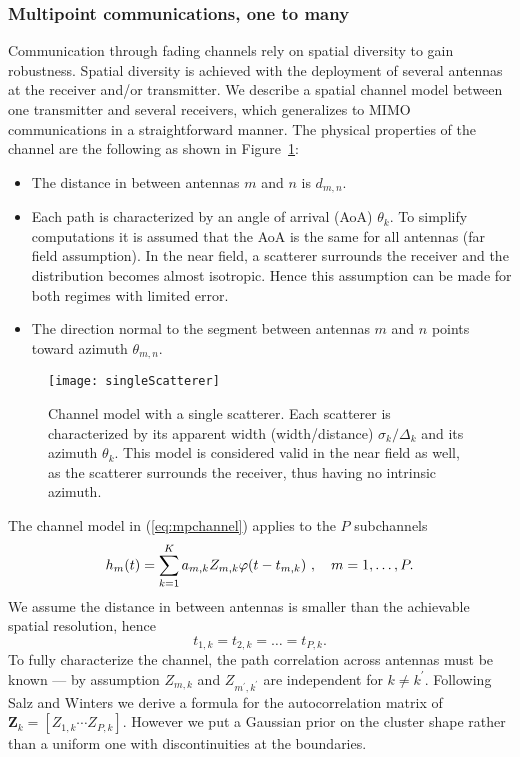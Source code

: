 \documentclass[journal,10pt]{IEEEtran}
\providecommand{\vct}[1]{\boldsymbol{#1}}
\begin{document}
	 \subsubsection{Multipoint communications, one to many}\label{sec:spmod}
	Communication through fading channels rely on spatial diversity to gain robustness. Spatial diversity is achieved with the deployment of several antennas at the receiver and/or transmitter. We describe a spatial channel model between one transmitter and several receivers, which generalizes to MIMO communications in a straightforward manner. The physical properties of the channel are the following as shown in Figure~\ref{fig:mpchannel}:
	\begin{itemize}
	\item The distance in between antennas $m$ and $n$ is $d_{m,n}$.
	\item Each path is characterized by an angle of arrival (AoA) $\theta_k$. To simplify computations it is assumed that the AoA is the same for all antennas (far field assumption). In the near field, a scatterer surrounds the receiver and the distribution becomes almost isotropic. Hence this assumption can be made for both regimes with limited error.
	\item The direction normal to the segment between antennas $m$ and $n$ points toward azimuth $\theta_{m,n}$.
	\end{itemize}
	\begin{figure}[h]
\centering 
\texttt{[image: singleScatterer]}
\caption{Channel model with a single scatterer. Each scatterer is characterized by its apparent width (width/distance) $\sigma_k/\Delta_k$ and its azimuth $\theta_k$. This model is considered valid in the near field as well, as the scatterer surrounds the receiver, thus having no intrinsic azimuth.}
\label{fig:mpchannel}
\end{figure}
	The channel model in (\ref{eq:mpchannel}) applies to the $P$ subchannels
	\begin{equation}
	  h_m(t)=\sum_{k=1}^K a_{m,k}Z_{m,k}\varphi(t-t_{m,k})\ ,\quad m=1,\dots,P.\\
	\end{equation}
	We assume the distance in between antennas is smaller than the achievable spatial resolution, hence $$t_{1,k}=t_{2,k}=\dots=t_{P,k}.$$
	To fully characterize the channel, the path correlation across antennas must be known --- by assumption $Z_{m,k}$ and $Z_{m^\prime,k^\prime}$ are independent for $k\neq k^\prime$.
	Following Salz and Winters \cite{Salz1994} we derive a formula for the autocorrelation matrix of $\vct{Z}_k=[Z_{1,k} \cdots Z_{P,k}]$. However we put a Gaussian prior on the cluster shape rather than a uniform one with discontinuities at the boundaries. 
\end{document}
